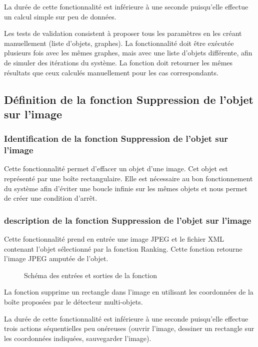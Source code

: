 \documentclass[debug,nodate,hideweeklyreports]{polytech/polytech}
\begin{document}
La durée de cette fonctionnalité est inférieure à une seconde puisqu'elle effectue un calcul simple sur peu de données.

Les tests de validation consistent à proposer tous les paramètres en les créant manuellement (liste d'objets, graphes). La fonctionnalité doit être exécutée plusieurs fois avec les mêmes graphes, mais avec une liste d'objets différente, afin de simuler des itérations du système. La fonction doit retourner les mêmes résultats que ceux calculés manuellement pour les cas correspondants.

\subsection{Définition de la fonction Suppression de l'objet sur l'image}

\subsubsection{Identification de la fonction Suppression de l'objet sur l'image}

Cette fonctionnalité permet d’effacer un objet d’une image. Cet objet est représenté par une boîte rectangulaire. 
Elle est nécessaire au bon fonctionnement du système afin d’éviter une boucle infinie sur les mêmes objets et nous permet de créer une condition d’arrêt.

\subsubsection{description de la fonction Suppression de l'objet sur l'image}

Cette fonctionnalité prend en entrée une image JPEG et le fichier XML contenant l’objet sélectionné par la fonction Ranking. Cette fonction retourne l’image JPEG amputée de l’objet.

\begin{figure}
  \caption{Schéma des entrées et sorties de la fonction}
  \label{fig:cropexpli}
\end{figure}

La fonction supprime un rectangle dans l’image en utilisant les coordonnées de la boîte proposées par le détecteur multi-objets. 

La durée de cette fonctionnalité est inférieure à une seconde puisqu'elle effectue trois actions séquentielles peu onéreuses (ouvrir l'image, dessiner un rectangle sur les coordonnées indiquées, sauvegarder l'image).
\end{document}
